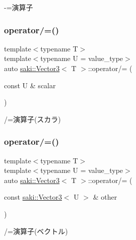 -\/=演算子 

\mbox{\label{classsaki_1_1_vector3_aacf8494aa9c503f70bad8039e1f926b9}} 
\subsubsection{\texorpdfstring{operator/=()}{operator/=()}\hspace{0.1cm}{\footnotesize\ttfamily [1/2]}}
{\footnotesize\ttfamily template$<$typename T$>$ \\
template$<$typename U  = value\+\_\+type$>$ \\
auto \mbox{\hyperlink{classsaki_1_1_vector3}{saki\+::\+Vector3}}$<$ T $>$\+::operator/= (\begin{DoxyParamCaption}\item[{const U \&}]{scalar }\end{DoxyParamCaption})\hspace{0.3cm}{\ttfamily [inline]}}



/=演算子(スカラ) 

\mbox{\label{classsaki_1_1_vector3_a220b8c3bece7b7e09660748eae50aea0}} 
\subsubsection{\texorpdfstring{operator/=()}{operator/=()}\hspace{0.1cm}{\footnotesize\ttfamily [2/2]}}
{\footnotesize\ttfamily template$<$typename T$>$ \\
template$<$typename U  = value\+\_\+type$>$ \\
auto \mbox{\hyperlink{classsaki_1_1_vector3}{saki\+::\+Vector3}}$<$ T $>$\+::operator/= (\begin{DoxyParamCaption}\item[{const \mbox{\hyperlink{classsaki_1_1_vector3}{saki\+::\+Vector3}}$<$ U $>$ \&}]{other }\end{DoxyParamCaption})\hspace{0.3cm}{\ttfamily [inline]}}



/=演算子(ベクトル) 

